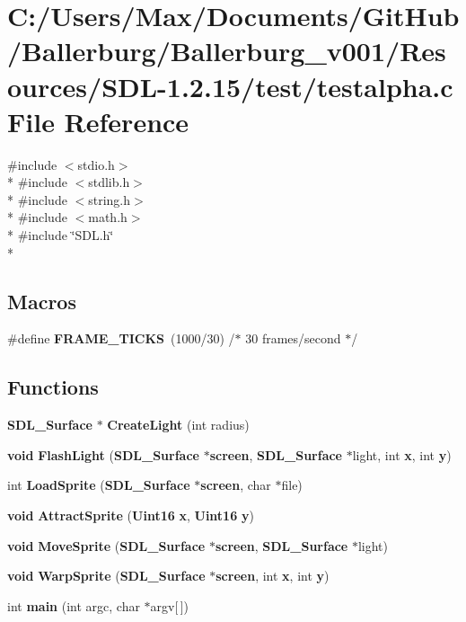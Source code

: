 \section{C\+:/\+Users/\+Max/\+Documents/\+Git\+Hub/\+Ballerburg/\+Ballerburg\+\_\+v001/\+Resources/\+S\+D\+L-\/1.2.15/test/testalpha.c File Reference}
\label{testalpha_8c}
{\ttfamily \#include $<$stdio.\+h$>$}\\*
{\ttfamily \#include $<$stdlib.\+h$>$}\\*
{\ttfamily \#include $<$string.\+h$>$}\\*
{\ttfamily \#include $<$math.\+h$>$}\\*
{\ttfamily \#include \char`\"{}S\+D\+L.\+h\char`\"{}}\\*
\subsection*{Macros}
\begin{DoxyCompactItemize}
\item 
\#define {\bf F\+R\+A\+M\+E\+\_\+\+T\+I\+C\+K\+S}~(1000/30)		/$\ast$ 30 frames/second $\ast$/
\end{DoxyCompactItemize}
\subsection*{Functions}
\begin{DoxyCompactItemize}
\item 
{\bf S\+D\+L\+\_\+\+Surface} $\ast$ {\bf Create\+Light} (int radius)
\item 
{\bf void} {\bf Flash\+Light} ({\bf S\+D\+L\+\_\+\+Surface} $\ast${\bf screen}, {\bf S\+D\+L\+\_\+\+Surface} $\ast$light, int {\bf x}, int {\bf y})
\item 
int {\bf Load\+Sprite} ({\bf S\+D\+L\+\_\+\+Surface} $\ast${\bf screen}, char $\ast$file)
\item 
{\bf void} {\bf Attract\+Sprite} ({\bf Uint16} {\bf x}, {\bf Uint16} {\bf y})
\item 
{\bf void} {\bf Move\+Sprite} ({\bf S\+D\+L\+\_\+\+Surface} $\ast${\bf screen}, {\bf S\+D\+L\+\_\+\+Surface} $\ast$light)
\item 
{\bf void} {\bf Warp\+Sprite} ({\bf S\+D\+L\+\_\+\+Surface} $\ast${\bf screen}, int {\bf x}, int {\bf y})
\item 
int {\bf main} (int argc, char $\ast$argv[$\,$])
\end{DoxyCompactItemize}


